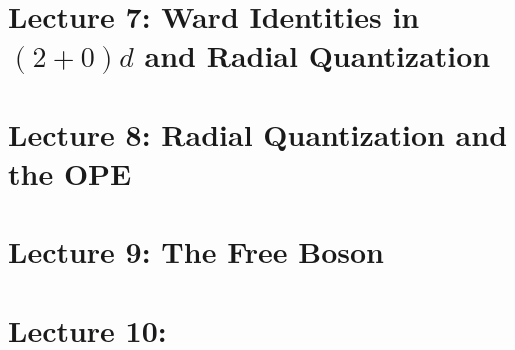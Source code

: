 \documentclass[10pt]{article}
\begin{document}
\clearpage

\section*{Lecture 7: Ward Identities in $(2+0)d$ and Radial Quantization}
\label{sec: lec7}



\clearpage

\section*{Lecture 8: Radial Quantization and the OPE}
\label{sec: lec8}



\clearpage

\section*{Lecture 9: The Free Boson}
\label{sec: lec9}



\clearpage

\section*{Lecture 10: }
\label{sec: lec10}

%

\end{document}
